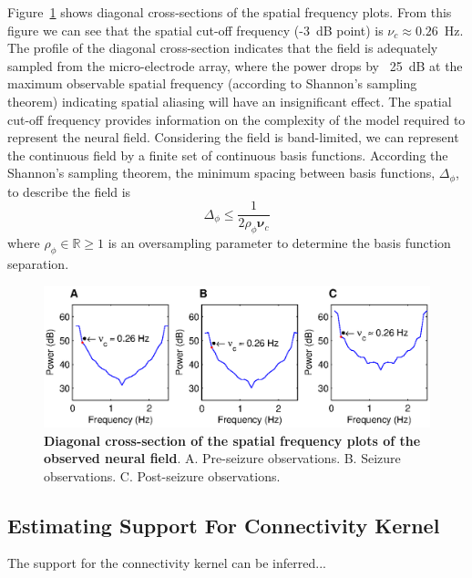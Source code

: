 \documentclass[]{article}
\begin{document}
Figure~\ref{fig:DiagSpatialFreqObservation} shows diagonal cross-sections of the spatial frequency plots. From this figure we can see that the spatial cut-off frequency (-3~dB point) is $\nu_c \approx 0.26$~Hz. The profile of the diagonal cross-section indicates that the field is adequately sampled from the micro-electrode array, where the power drops by ~25~dB at the maximum observable spatial frequency (according to Shannon's sampling theorem) indicating spatial aliasing will have an insignificant effect. The spatial cut-off frequency provides information on the complexity of the model required to represent the neural field. Considering the field is band-limited, we can represent the continuous field by a finite set of continuous basis functions. According the Shannon's sampling theorem, the minimum spacing between basis functions, $\Delta_{\phi}$, to describe the field is
\begin{equation}\label{eq:BasisFunctionSeparation}
	\Delta_{\phi} \leq \frac{1}{2\rho_{\phi}\boldsymbol{\nu}_{c}}
\end{equation}
where $\rho_{\phi} \in \mathbb{R} \ge 1$ is an oversampling parameter to determine the basis function separation.

\begin{figure}[!ht]
\begin{center}
\includegraphics{./Figures/SpatialFreqCrossSection.eps}
\end{center}
\caption{{\bf Diagonal cross-section of the spatial frequency plots of the observed neural field}. A. Pre-seizure observations. B. Seizure observations. C. Post-seizure observations.}
\label{fig:DiagSpatialFreqObservation}
\end{figure}

\subsection{Estimating Support For Connectivity Kernel}
The support for the connectivity kernel can be inferred...
\end{document}
